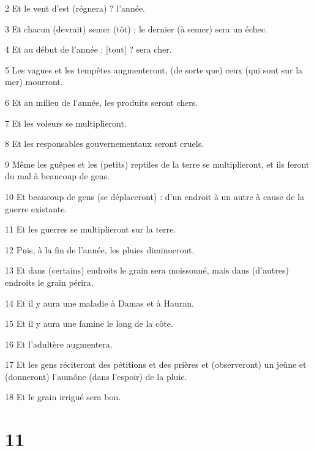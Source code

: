 \par 2 Et le vent d'est (régnera) ? l'année.

\par 3 Et chacun (devrait) semer (tôt) ; le dernier (à semer) sera un échec.

\par 4 Et au début de l'année : [tout] ? sera cher.

\par 5 Les vagues et les tempêtes augmenteront, (de sorte que) ceux (qui sont sur la mer) mourront.

\par 6 Et au milieu de l'année, les produits seront chers.

\par 7 Et les voleurs se multiplieront.

\par 8 Et les responsables gouvernementaux seront cruels.

\par 9 Même les guêpes et les (petits) reptiles de la terre se multiplieront, et ils feront du mal à beaucoup de gens.

\par 10 Et beaucoup de gens (se déplaceront) : d'un endroit à un autre à cause de la guerre existante.

\par 11 Et les guerres se multiplieront sur la terre.

\par 12 Puis, à la fin de l'année, les pluies diminueront.

\par 13 Et dans (certains) endroits le grain sera moissonné, mais dans (d'autres) endroits le grain périra.

\par 14 Et il y aura une maladie à Damas et à Hauran.

\par 15 Et il y aura une famine le long de la côte.

\par 16 Et l'adultère augmentera.

\par 17 Et les gens réciteront des pétitions et des prières et (observeront) un jeûne et (donneront) l'aumône (dans l'espoir) de la pluie.

\par 18 Et le grain irrigué sera bon.

\chapter{11}

